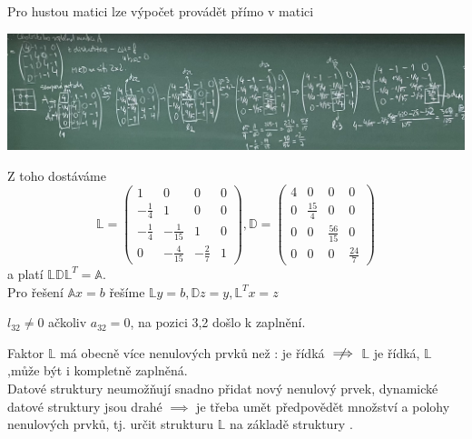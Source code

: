 \documentclass[../main.tex]{subfiles}
\begin{document}
\begin{remark}
    Pro hustou matici lze výpočet provádět přímo v matici \matA 
\end{remark}



\begin{example}
    
    
\begin{center}
    \includegraphics[width=\linewidth]{images/12-10-example.jpg}
\end{center}

Z toho dostáváme 
\begin{equation*}
    \mathbb{L} = \begin{pmatrix}
        1 & 0 & 0 & 0 \\
        -\frac{1}{4} & 1 & 0 & 0 \\
        -\frac{1}{4} & -\frac{1}{15} & 1 & 0 \\
        0 & -\frac{4}{15} & -\frac{2}{7} & 1 
        \end{pmatrix} , \mathbb{D} = \begin{pmatrix}
            4 & 0 & 0 & 0 \\
            0 & \frac{15}{4} & 0 & 0 \\
            0 & 0 & \frac{56}{15} & 0 \\
            0 & 0 & 0 & \frac{24}{7} 
            \end{pmatrix}
\end{equation*}
a platí $\mathbb{L}\mathbb{D}\mathbb{L}^T = \mathbb{A}$.\\
Pro řešení $\mathbb{A}x = b$ řešíme $\mathbb{L}y = b, \mathbb{D}z = y, \mathbb{L}^T x = z$
\end{example}

\begin{remark}

    $l_{32} \neq 0$ ačkoliv $a_{32} = 0$, na pozici 3,2 došlo k zaplnění.

    Faktor $\mathbb{L}$ má obecně více nenulových prvků než \matA : \matA je řídká $\centernot\implies$ $\mathbb{L}$ je řídká, $\mathbb{L}$ ,může být i kompletně zaplněná.\\
    Datové struktury neumožňují snadno přidat nový nenulový prvek, dynamické datové struktury jsou drahé
    $\implies$ je třeba umět předpovědět množství a polohy nenulových prvků, tj. určit strukturu 
    $\mathbb{L}$ na základě struktury \matA .
\end{remark}
\end{document}
